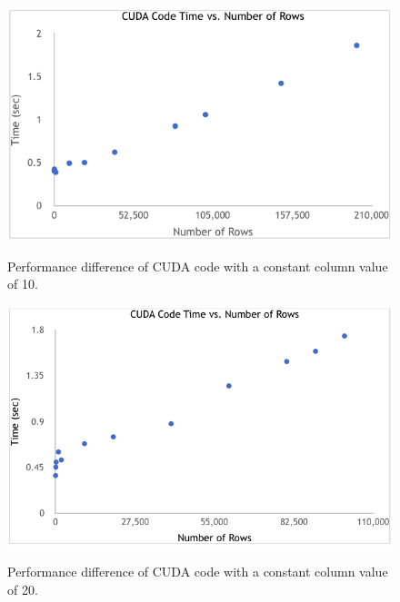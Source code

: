 \documentclass[letterpaper, 10 pt, conference]{ieeeconf}  %
\begin{document}
	\begin{figure}[thpb]
		\centering
		\includegraphics[width=\linewidth]{cudarow10.png}
		\label{fig:row10}
		\caption{Performance difference of CUDA code with a constant column value of 10.}
	\end{figure}
	\begin{figure}[thpb]
		\centering
		\includegraphics[width=\linewidth]{cudarow20.png}
		\label{fig:row20}
		\caption{Performance difference of CUDA code with a constant column value of 20.}
	\end{figure}	


\end{document}

